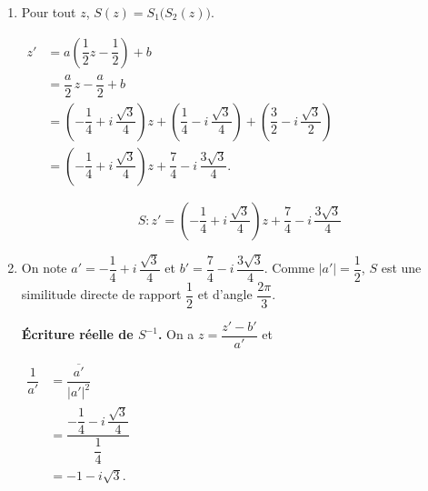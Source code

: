 \documentclass[12pt,a4paper]{article}
\begin{document}
\begin{enumerate}
    $
    \begin{aligned}
    b &= z_O - a\,z_A \\[1mm]
      &= 0 - \dfrac12 \times 1 \\[1mm]
      &= -\dfrac12.
    \end{aligned}
    $

    $
    \begin{aligned}
    \omega &= \dfrac{b}{1-a} \\[1mm]
           &= \dfrac{-\dfrac12}{\dfrac12} \\[1mm]
           &= -1.
    \end{aligned}
    $

    \[
    \boxed{S_2 : z' = \dfrac12\,z - \dfrac12 \text{ est l'homothétie de centre } B(-1) \text{ et de rapport } \dfrac12.}
    \]

    \item Pour tout $z$, $S(z) = S_1\bigl(S_2(z)\bigr)$.

    $
    \begin{aligned}
    z' &= a\left(\dfrac12 z - \dfrac12\right) + b \\[1mm]
       &= \dfrac{a}{2}\,z - \dfrac{a}{2} + b \\[1mm]
       &= \left(-\dfrac14 + i\,\dfrac{\sqrt3}{4}\right)z + \left(\dfrac14 - i\,\dfrac{\sqrt3}{4}\right) + \left(\dfrac32 - i\,\dfrac{\sqrt3}{2}\right) \\[1mm]
       &= \left(-\dfrac14 + i\,\dfrac{\sqrt3}{4}\right)z + \dfrac74 - i\,\dfrac{3\sqrt3}{4}.
    \end{aligned}
    $

    \[
    \boxed{S : z' = \left(-\dfrac14 + i\,\dfrac{\sqrt3}{4}\right)z + \dfrac74 - i\,\dfrac{3\sqrt3}{4}}
    \]

    \item On note $a' = -\dfrac14 + i\,\dfrac{\sqrt3}{4}$ et $b' = \dfrac74 - i\,\dfrac{3\sqrt3}{4}$. Comme $|a'| = \dfrac12$, $S$ est une similitude directe de rapport $\dfrac12$ et d'angle $\dfrac{2\pi}{3}$.

    \textbf{Écriture réelle de $S^{-1}$.} On a $z = \dfrac{z' - b'}{a'}$ et

    $
    \begin{aligned}
    \dfrac{1}{a'} &= \dfrac{\overline{a'}}{|a'|^2} \\[1mm]
                  &= \dfrac{-\dfrac14 - i\,\dfrac{\sqrt3}{4}}{\dfrac14} \\[1mm]
                  &= -1 - i\sqrt3.
    \end{aligned}
    $


\end{enumerate}
\end{document}

